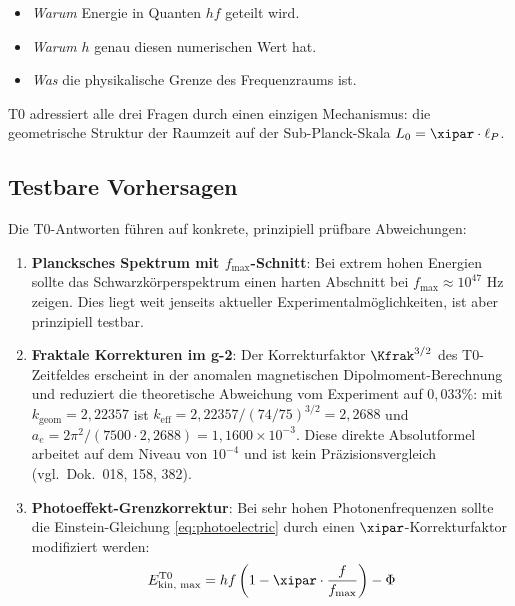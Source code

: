 \begin{itemize}
    \item \emph{Warum} Energie in Quanten $hf$ geteilt wird.
    \item \emph{Warum} $h$ genau diesen numerischen Wert hat.
    \item \emph{Was} die physikalische Grenze des Frequenzraums ist.
\end{itemize}

T0 adressiert alle drei Fragen durch einen einzigen Mechanismus: die geometrische 
Struktur der Raumzeit auf der Sub-Planck-Skala $L_0 = \xipar \cdot \ell_P$.

\subsection{Testbare Vorhersagen}

Die T0-Antworten führen auf konkrete, prinzipiell 
prüfbare Abweichungen:

\begin{enumerate}
    \item \textbf{Plancksches Spektrum mit $f_{\max}$-Schnitt}: Bei extrem hohen 
    Energien sollte das Schwarzkörperspektrum einen harten Abschnitt bei 
    $f_{\max} \approx 10^{47}$ Hz zeigen. Dies liegt weit jenseits aktueller 
    Experimentalmöglichkeiten, ist aber prinzipiell testbar.
    
    \item \textbf{Fraktale Korrekturen im g-2}: Der Korrekturfaktor $\Kfrak^{3/2}$ 
    des T0-Zeitfeldes erscheint in der anomalen magnetischen Dipolmoment-Berechnung 
    und reduziert die theoretische Abweichung vom Experiment auf $0{,}033\%$: mit
    $k_\text{geom} = 2{,}22357$ ist $k_\text{eff} = 2{,}22357/(74/75)^{3/2} = 2{,}2688$ und
    $a_e = 2\pi^2/(7500 \cdot 2{,}2688) = 1{,}1600\times10^{-3}$. Diese direkte
    Absolutformel arbeitet auf dem Niveau von $10^{-4}$ und ist kein
    Präzisionsvergleich (vgl.\ Dok.~018, 158, 382).
    
    \item \textbf{Photoeffekt-Grenzkorrektur}: Bei sehr hohen Photonenfrequenzen 
    sollte die Einstein-Gleichung \eqref{eq:photoelectric} durch einen 
    $\xipar$-Korrekturfaktor modifiziert werden:
    \begin{equation}
        E_{\text{kin, max}}^{\text{T0}} = hf\left(1 - \xipar \cdot \frac{f}{f_{\max}}\right) - \Phi
        \label{eq:photoelectric_t0}
    \end{equation}
\end{enumerate}

